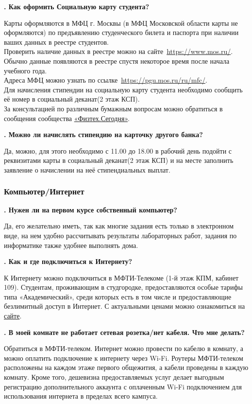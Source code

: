 \documentclass[14pt]{extarticle}
\newcounter{question}
\newcommand\Que[1]{%
    \begin{minipage}{\textwidth}
    \leavevmode\par
    \stepcounter{question}
    \noindent
    {\large\textbf{\thequestion. #1}}\par}
\newcommand\Ans[2][]{%
    \leavevmode\par\noindent
    {\leftskip37pt
    \textbf{#1}#2\par}
    \end{minipage}}
\begin{document}
\Que{Как оформить Социальную карту студента?}
\Ans{Карты оформляются в МФЦ г. Москвы (в МФЦ Московской области карты не оформляются) по предъявлению студенческого билета и паспорта при наличии ваших данных в реестре студентов. \\ Проверить наличие данных в реестре можно на сайте \href{https://www.mos.ru/socialnaya-karta/services-proverka-grazhdanina-v-reestre-studentov/}{https://www.mos.ru/}. Обычно данные появляются в реестре спустя некоторое время после начала учебного года. \\ Адреса МФЦ можно узнать по ссылке \href{https://pgu.mos.ru/ru/mfc/}{https://pgu.mos.ru/ru/mfc/}. \\ Для начисления стипендии на социальную карту студента необходимо сообщить её номер в социальный деканат(2 этаж КСП). \\ За консультацией по различным бумажным вопросам можно обратиться в сообщения сообщества \href{https://vk.com/students_of_mipt}{«Физтех.Сегодня»}.}

\Que{Можно ли начислять стипендию на карточку другого банка?}
\Ans{Да, можно, для этого необходимо с 11.00 до 18.00 в рабочий день подойти с реквизитами карты в социальный деканат(2 этаж КСП) и на месте заполнить заявление о начислении на неё стипендиальных выплат. }

\subsubsection{Компьютер/Интернет}

\Que{Нужен ли на первом курсе собственный компьютер?}
\Ans{Да, его желательно иметь, так как многие задания есть только в электронном виде, на нем удобно рассчитывать результаты лабораторных работ, задания по информатике также удобнее выполнять дома.}

\Que{Как и где подключиться к Интернету?}
\Ans{К Интернету можно подключиться в МФТИ-Телекоме (1-й этаж КПМ, кабинет 109). Студентам, проживающим в студгородке, предоставляются особые тарифы типа «Академический», среди которых есть в том числе и предоставляющие безлимитный доступ в Интернет. С актуальными ценами можно ознакомиться на \href{http://mipt-telecom.ru/}{сайте}.}

\Que{В моей комнате не работает сетевая розетка/нет кабеля. Что мне делать?}
\Ans{Обратиться в МФТИ-телеком. Интернет можно провести по кабелю в комнату, а можно оплатить подключение к интернету через Wi-Fi. Роутеры МФТИ-телеком расположены на каждом этаже первого общежития, а кабели проведены в каждую комнату. Кроме того, дешевизна предоставляемых услуг делает выгодным регистрацию дополнительного аккаунта с оплаченным Wi-Fi подключением для использования интернета в пределах всего кампуса.}
\end{document}
